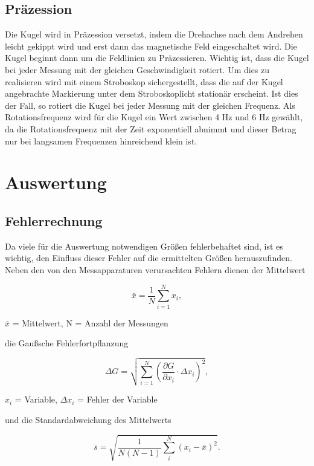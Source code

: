 \subsection{Präzession}
Die Kugel wird in Präzession versetzt, indem die Drehachse nach dem Andrehen leicht gekippt wird und erst dann das magnetische Feld eingeschaltet wird. Die Kugel beginnt dann um die Feldlinien zu Präzessieren. Wichtig ist, dass die Kugel bei jeder Messung mit der gleichen Geschwindigkeit rotiert. Um dies zu realisieren wird mit einem Stroboskop sichergestellt, dass die auf der Kugel angebrachte Markierung unter dem Stroboskoplicht stationär erscheint. Ist dies der Fall, so rotiert die Kugel bei jeder Messung mit der gleichen Frequenz. Als Rotationsfrequenz wird für die Kugel ein Wert zwischen 4 Hz und 6 Hz gewählt, da die Rotationsfrequenz mit der Zeit exponentiell abnimmt und dieser Betrag nur bei langsamen Frequenzen hinreichend klein ist.  

\section{Auswertung}
\subsection{Fehlerrechnung}
Da viele für die Auswertung notwendigen Größen fehlerbehaftet sind, ist es wichtig, den Einfluss dieser Fehler auf die ermittelten
Größen herauszufinden. Neben den von den Messapparaturen verursachten Fehlern dienen der Mittelwert

\begin{formel}
\begin{equation}
 \bar{x} = \frac1N \sum_{i=1}^{N} x_i,
\end{equation}
\caption*{\small{$\bar{x}$ = Mittelwert, N = Anzahl der Messungen}}
\end{formel}

die Gaußsche Fehlerfortpflanzung

\begin{formel}[H]
\begin{equation}
\Delta G = \sqrt{\sum_{i=1}^{N}\left( \frac{\partial G}{\partial x_i}\cdot \Delta x_i\right)^2},
\label{gauss}
\end{equation}
\caption*{$x_i$ = Variable, $\Delta x_i$ = Fehler der Variable}
\end{formel}

und die Standardabweichung des Mittelwerts

\begin{equation}
 \bar s = \sqrt{\frac{1}{N(N-1)} \sum_{i}^{N} (x_i - \bar{x})^2}.
\end{equation}

